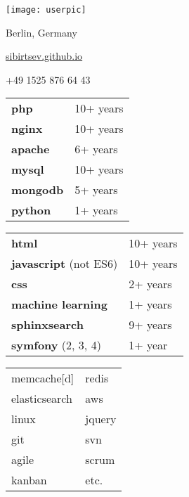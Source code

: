 \documentclass[paper=a4,fontsize=11pt]{eucv}
\begin{document}
\begin{minipage}{.2\linewidth}
   \texttt{[image: userpic]}
\end{minipage}      
\begin{minipage}{0.7\linewidth}
   \sepspace
   \noindent
   
   \hfill Berlin, Germany

   \hfill {}%
   
   \hfill \href{https://sibirtsev.github.io/}{sibirtsev.github.io}%
   
   \hfill +49 1525 876 64 43%
   
   \hfill {}%
\end{minipage}


\hspace{3mm}
\begin{minipage}[t]{0.33\textwidth} 
	
	\begin{tabular}[t]{ l l }
		\textbf{php} & 10+ years \\
		\textbf{nginx} & 10+ years \\
		\textbf{apache} & 6+ years \\
		\textbf{mysql} & 10+ years \\
		\textbf{mongodb} & 5+ years \\
		\textbf{python} & 1+ years \\
	\end{tabular}
	
	\sepspace
	
\end{minipage}
%
\begin{minipage}[t]{0.33\textwidth} 
	
	\begin{tabular}[t]{ l l }
		\textbf{html} & 10+ years \\
		\textbf{javascript} (not ES6) & 10+ years \\
		\textbf{css} & 2+ years \\
		\textbf{machine learning} & 1+ years \\
		\textbf{sphinxsearch} & 9+ years \\
		\textbf{symfony} (2, 3, 4) & 1+ year
	\end{tabular}
	
	\sepspace
	
\end{minipage}
%
\begin{minipage}[t]{0.33\textwidth} 
	\begin{tabular}[t]{l l}
		memcache[d] & redis \\
		elasticsearch & aws \\
		linux & jquery  \\
		git & svn \\
		agile & scrum  \\
		kanban & etc. \\
	\end{tabular}
\end{minipage}
\end{document}
